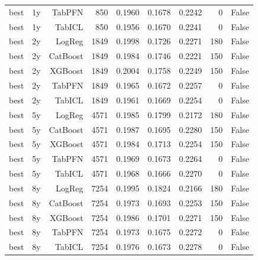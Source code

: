 \begin{table}[t]
\begin{tabular}{lrrrrrrrr}
  best & 1y & TabPFN & 850 & 0.1960 & 0.1678 & 0.2242 & 0 & False \\
  best & 1y & TabICL & 850 & 0.1956 & 0.1670 & 0.2241 & 0 & False \\
  best & 2y & LogReg & 1849 & 0.1998 & 0.1726 & 0.2271 & 180 & False \\
  best & 2y & CatBoost & 1849 & 0.1984 & 0.1746 & 0.2221 & 150 & False \\
  best & 2y & XGBoost & 1849 & 0.2004 & 0.1758 & 0.2249 & 150 & False \\
  best & 2y & TabPFN & 1849 & 0.1965 & 0.1672 & 0.2257 & 0 & False \\
  best & 2y & TabICL & 1849 & 0.1961 & 0.1669 & 0.2254 & 0 & False \\
  best & 5y & LogReg & 4571 & 0.1985 & 0.1799 & 0.2172 & 180 & False \\
  best & 5y & CatBoost & 4571 & 0.1987 & 0.1695 & 0.2280 & 150 & False \\
  best & 5y & XGBoost & 4571 & 0.1984 & 0.1713 & 0.2254 & 150 & False \\
  best & 5y & TabPFN & 4571 & 0.1969 & 0.1673 & 0.2264 & 0 & False \\
  best & 5y & TabICL & 4571 & 0.1968 & 0.1666 & 0.2270 & 0 & False \\
  best & 8y & LogReg & 7254 & 0.1995 & 0.1824 & 0.2166 & 180 & False \\
  best & 8y & CatBoost & 7254 & 0.1973 & 0.1693 & 0.2253 & 150 & False \\
  best & 8y & XGBoost & 7254 & 0.1986 & 0.1701 & 0.2271 & 150 & False \\
  best & 8y & TabPFN & 7254 & 0.1973 & 0.1675 & 0.2272 & 0 & False \\
  best & 8y & TabICL & 7254 & 0.1976 & 0.1673 & 0.2278 & 0 & False \\
  \bottomrule
  \end{tabular}
\end{table}
